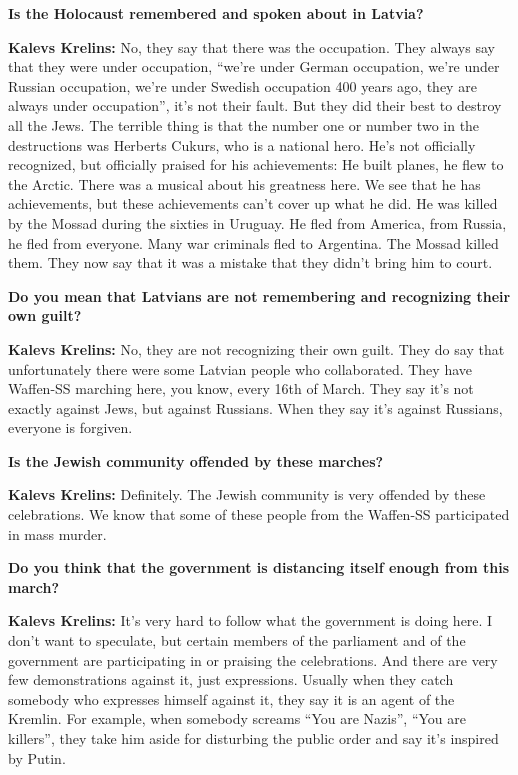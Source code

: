 \textbf{Is the Holocaust remembered and spoken about in Latvia?} 

\textbf{Kalevs Krelins:} No, they say that there was the occupation. They always say that they were under occupation, ``we’re under German occupation, we’re under Russian occupation, we’re under Swedish occupation 400 years ago, they are always under occupation'', it's not their fault. But they did their best to destroy all the Jews. The terrible thing is that the number one or number two in the destructions was Herberts Cukurs, who is a national hero. He's not officially recognized, but officially praised for his achievements: He built planes, he flew to the Arctic. There was a musical about his greatness here. We see that he has achievements, but these achievements can’t cover up what he did. He was killed by the Mossad during the sixties in Uruguay. He fled from America, from Russia, he fled from everyone. Many war criminals fled to Argentina. The Mossad killed them. They now say that it was a mistake that they didn't bring him to court. 

\textbf{Do you mean that Latvians are not remembering and recognizing their own guilt?} 

\textbf{Kalevs Krelins:} No, they are not recognizing their own guilt. They do say that unfortunately there were some Latvian people who collaborated. They have Waffen-SS marching here, you know, every 16th of March. They say it's not exactly against Jews, but against Russians. When they say it's against Russians, everyone is forgiven. 

\textbf{Is the Jewish community offended by these marches?}   

\textbf{Kalevs Krelins:} Definitely. The Jewish community is very offended by these celebrations. We know that some of these people from the Waffen-SS participated in mass murder.   

\textbf{Do you think that the government is distancing itself enough from this march?}  

\textbf{Kalevs Krelins:} It’s very hard to follow what the government is doing here. I don’t want to speculate, but certain members of the parliament and of the government are participating in or praising the celebrations. And there are very few demonstrations against it, just expressions. Usually when they catch somebody who expresses himself against it, they say it is an agent of the Kremlin.  For example, when somebody screams ``You are Nazis'', ``You are killers'', they take him aside for disturbing the public order and say it’s inspired by Putin.  

